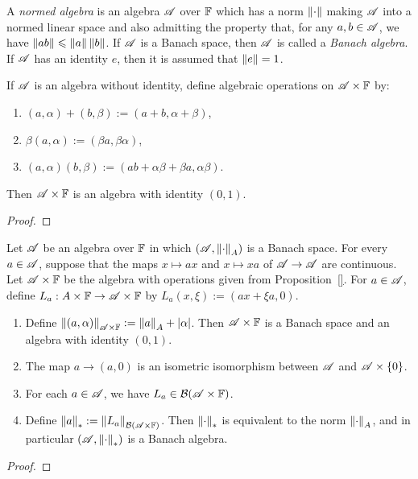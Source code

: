 \documentclass[reqno]{amsart}
\begin{document}
\begin{definition}
	A \emph{normed algebra} is an algebra $\mathscr{A}$ over $\mathbb{F}$ which has a norm $\left\lVert \cdot \right\rVert$ making $\mathscr{A}$ into a normed linear space and also admitting the property that, for any $a,b \in \mathscr{A}$, we have $\left\lVert ab \right\rVert \leqslant \left\lVert a \right\rVert \left\lVert b \right\rVert$. If $\mathscr{A}$ is a Banach space, then $\mathscr{A}$ is called a \emph{Banach algebra}. If $\mathscr{A}$ has an identity $e$, then it is assumed that $\left\lVert e \right\rVert = 1$.
\end{definition}

\begin{proposition}
	If $\mathscr{A}$ is an algebra without identity, define algebraic operations on $\mathscr{A} \times \mathbb{F}$ by:
	\mbox{}
	\begin{enumerate}[label = (\roman*),itemsep=1pt,topsep=3pt]
		\item $(a,\alpha) + (b,\beta) := (a+b,\alpha + \beta)$,
		\item $\beta(a,\alpha) := (\beta a, \beta \alpha)$,
		\item $(a,\alpha)(b,\beta) := (ab + \alpha \beta + \beta a, \alpha \beta)$.
	\end{enumerate}
	Then $\mathscr{A} \times \mathbb{F}$ is an algebra with identity $(0,1)$.
\end{proposition}
	{\color{red}
	\begin{proof}
			
	\end{proof}}


\begin{proposition}
	Let $\mathscr{A}$ be an algebra over $\mathbb{F}$ in which $(\mathscr{A},\left\lVert \cdot \right\rVert_A)$ is a Banach space. For every $a \in \mathscr{A}$, suppose that the maps $x \mapsto ax$ and $x \mapsto xa$ of $\mathscr{A} \rightarrow \mathscr{A}$ are continuous. Let $\mathscr{A} \times \mathbb{F}$ be the algebra with operations given from Proposition~\ref{}. For $a \in \mathscr{A}$, define $L_a:A \times \mathbb{F} \rightarrow \mathscr{A} \times \mathbb{F}$ by $L_a(x,\xi) := (ax + \xi a,0)$.
\end{proposition}
	\mbox{}
	\begin{enumerate}[label = (\arabic*),itemsep=1pt,topsep=3pt]
		\item Define $\left\lVert (a,\alpha) \right\rVert_{\mathscr{A} \times \mathbb{F}}:= \left\lVert a \right\rVert_A + |\alpha|$. Then $\mathscr{A} \times \mathbb{F}$ is a Banach space and an algebra with identity $(0,1)$.
		\item The map $a \rightarrow (a,0)$ is an isometric isomorphism between $\mathscr{A}$ and $\mathscr{A} \times \{0\}$.
		\item For each $a \in \mathscr{A}$, we have $L_a \in \mathcal{B}(\mathscr{A} \times \mathbb{F})$.
		\item Define $\left\lVert a \right\rVert_{\ast} := \left\lVert L_a \right\rVert_{\mathcal{B}(\mathscr{A} \times \mathbb{F})}$. Then $\left\lVert \cdot \right\rVert_{\ast}$ is equivalent to the norm $\left\lVert \cdot \right\rVert_A$, and in particular $(\mathscr{A},\left\lVert \cdot \right\rVert_{\ast})$ is a Banach algebra.
	\end{enumerate}
	{\color{red}
	\begin{proof}
			
	\end{proof}}
\end{document}
